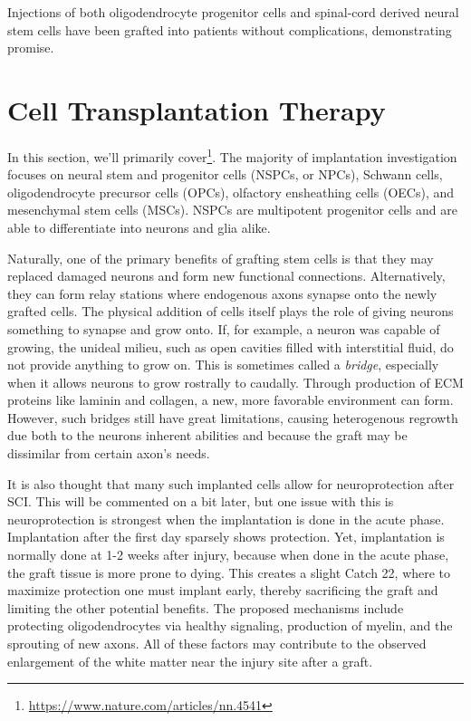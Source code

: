 Injections of both oligodendrocyte progenitor cells and spinal-cord derived neural stem cells have been grafted into patients without complications, demonstrating promise.\newline

\section{Cell Transplantation Therapy}

In this section, we'll primarily cover\footnote{\url{https://www.nature.com/articles/nn.4541}}. The majority of implantation investigation focuses on neural stem and progenitor cells (NSPCs, or NPCs), Schwann cells, oligodendrocyte precursor cells (OPCs), olfactory ensheathing cells (OECs), and mesenchymal stem cells (MSCs). NSPCs are multipotent progenitor cells and are able to differentiate into neurons and glia alike.\newline

Naturally, one of the primary benefits of grafting stem cells is that they may replaced damaged neurons and form new functional connections. Alternatively, they can form relay stations where endogenous axons synapse onto the newly grafted cells. The physical addition of cells itself plays the role of giving neurons something to synapse and grow onto. If, for example, a neuron was capable of growing, the unideal milieu, such as open cavities filled with interstitial fluid, do not provide anything to grow on. This is sometimes called  a \textit{bridge}, especially when it allows neurons to grow rostrally to caudally. Through production of ECM proteins like laminin and collagen, a new, more favorable environment can form. However, such bridges still have great limitations, causing heterogenous regrowth due both to the neurons inherent abilities and because the graft may be dissimilar from certain axon's needs.\newline

It is also thought that many such implanted cells allow for neuroprotection after SCI. This will be commented on a bit later, but one issue with this is neuroprotection is strongest when the implantation is done in the acute phase. Implantation after the first day sparsely shows protection. Yet, implantation is normally done at 1-2 weeks after injury, because when done in the acute phase, the graft tissue is more prone to dying. This creates a slight Catch 22, where to maximize protection one must implant early, thereby sacrificing the graft and limiting the other potential benefits. The proposed mechanisms include protecting oligodendrocytes via healthy signaling, production of myelin, and the sprouting of new axons. All of these factors may contribute to the observed enlargement of the white matter near the injury site after a graft.\newline

